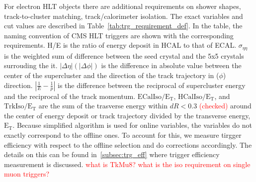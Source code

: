 For electron HLT objects there are additional requirements on
shower shapes, %
track-to-cluster matching, %
track/calorimeter isolation. %
The exact variables and cut values are described in Table~\ref{tab:trg_requirement_def}.
In the table, the naming convention of CMS HLT triggers are shown 
with the corresponding requirements. 
H/E is the ratio of energy deposit in HCAL to that of ECAL. 
$\sigma_{\eta\eta}$ is the weighted sum of \Eta{} difference between the 
seed crystal and the 5x5 crystals surrouding the it.   
$|\Delta\eta|(|\Delta\phi|)$ is the difference in absolute value between 
the center of the supercluster and the direction of the track trajectory 
in \Eta($\phi$) direction.   
$|\frac{1}{E}-\frac{1}{p}|$ is the difference between the reciprocal of supercluster energy 
and the reciprocal of the track momentum.  
$\mathrm{ECalIso/E_T}$, $\mathrm{HCalIso/E_T}$, and $\mathrm{TrkIso/E_T}$ 
are the sum of the trasverse energy within $dR<0.3$ \textcolor{red}{(checked)} 
around the center of energy deposit or track trajectory
divided by the transverse energy, $\mathrm{E_T}$. 
Because simplified algorithm is used for online variables, the variables 
do not exactly correspond to the offline ones. To account for this, we measure 
tirgger efficiency with respect to the offline selection and do corrections accordingly. 
The details on this can be found in~\ref{subsec:trg_eff} where trigger efficiency 
measurement is discussed.
\textcolor{red}{what is TkMu8? what is the iso requirement on single muon triggers?} 

